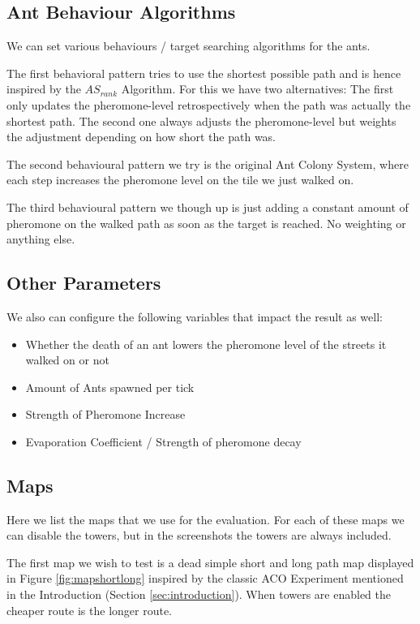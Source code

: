 \subsection{Ant Behaviour Algorithms}
\label{sec:behaviour}
We can set various behaviours / target searching algorithms for the ants.

The first behavioral pattern tries to use the shortest possible path and is hence inspired by the $AS_{rank}$ Algorithm\cite{zecchin2007ant}.
For this we have two alternatives: The first only updates the pheromone-level retrospectively when the path was actually the shortest path. The second one always adjusts the pheromone-level but weights the adjustment depending on how short the path was.

The second behavioural pattern we try is the original Ant Colony System\cite{maniezzo2002ant}, where each step increases the pheromone level on the tile we just walked on.

The third behavioural pattern we though up is just adding a constant amount of pheromone on the walked path as soon as the target is reached. No weighting or anything else.

\subsection{Other Parameters}
\label{sec:otherparamas}
We also can configure the following variables that impact the result as well:
\begin{itemize}
\item  Whether the death of an ant lowers the pheromone level of the streets it walked on or not
\item Amount of Ants spawned per tick
\item Strength of Pheromone Increase
\item Evaporation Coefficient / Strength of pheromone decay
\end{itemize}

\subsection{Maps}
\label{sec:testmaps}
Here we list the maps that we use for the evaluation. For each of these maps we can disable the towers, but in the screenshots the towers are always included.

The first map we wish to test is a dead simple short and long path map displayed in Figure \ref{fig:mapshortlong} inspired by the classic ACO Experiment mentioned in the Introduction (Section \ref{sec:introduction}). When towers are enabled the cheaper route is the longer route.


